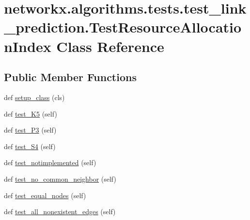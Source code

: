 \hypertarget{classnetworkx_1_1algorithms_1_1tests_1_1test__link__prediction_1_1TestResourceAllocationIndex}{}\section{networkx.\+algorithms.\+tests.\+test\+\_\+link\+\_\+prediction.\+Test\+Resource\+Allocation\+Index Class Reference}
\label{classnetworkx_1_1algorithms_1_1tests_1_1test__link__prediction_1_1TestResourceAllocationIndex}
\subsection*{Public Member Functions}
\begin{DoxyCompactItemize}
\item 
def \hyperlink{classnetworkx_1_1algorithms_1_1tests_1_1test__link__prediction_1_1TestResourceAllocationIndex_aa55384435b52bbb719d55a7eb8d7e4bb}{setup\+\_\+class} (cls)
\item 
def \hyperlink{classnetworkx_1_1algorithms_1_1tests_1_1test__link__prediction_1_1TestResourceAllocationIndex_a495d845d2056abac5ae21eada81c8faf}{test\+\_\+\+K5} (self)
\item 
def \hyperlink{classnetworkx_1_1algorithms_1_1tests_1_1test__link__prediction_1_1TestResourceAllocationIndex_a7bf3a4632b0335a3da022d7dfe227b93}{test\+\_\+\+P3} (self)
\item 
def \hyperlink{classnetworkx_1_1algorithms_1_1tests_1_1test__link__prediction_1_1TestResourceAllocationIndex_a8b093056f89c4c76b477f6ca6c514166}{test\+\_\+\+S4} (self)
\item 
def \hyperlink{classnetworkx_1_1algorithms_1_1tests_1_1test__link__prediction_1_1TestResourceAllocationIndex_a8a5b4644927c39cdf119fbf418d87bb2}{test\+\_\+notimplemented} (self)
\item 
def \hyperlink{classnetworkx_1_1algorithms_1_1tests_1_1test__link__prediction_1_1TestResourceAllocationIndex_a319a7d8484f3e09e82df859814a3fffd}{test\+\_\+no\+\_\+common\+\_\+neighbor} (self)
\item 
def \hyperlink{classnetworkx_1_1algorithms_1_1tests_1_1test__link__prediction_1_1TestResourceAllocationIndex_a7c7590033982268dca24b73374b50f6a}{test\+\_\+equal\+\_\+nodes} (self)
\item 
def \hyperlink{classnetworkx_1_1algorithms_1_1tests_1_1test__link__prediction_1_1TestResourceAllocationIndex_accba182ecc8ba95d5c17ce55001bfb35}{test\+\_\+all\+\_\+nonexistent\+\_\+edges} (self)
\end{DoxyCompactItemize}
